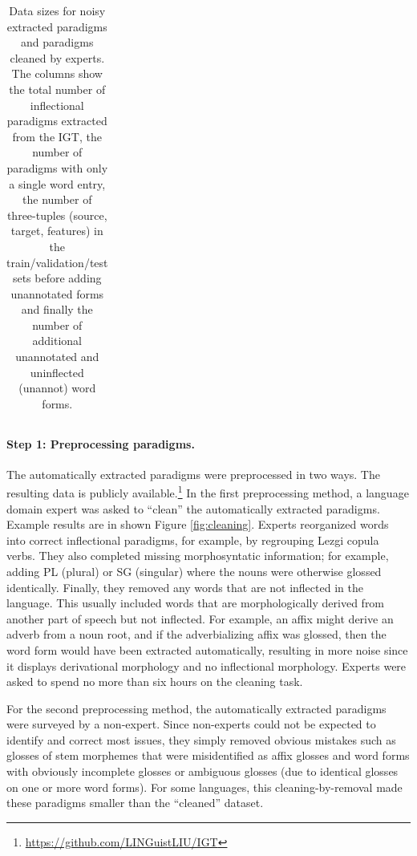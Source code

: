\begin{table}[!tb]
\begin{tabular}{l|ccccccc}
    \end{tabular}
    \caption[IGT2P data]{Data sizes for noisy extracted paradigms and paradigms cleaned by experts. The columns show the total number of inflectional paradigms extracted from the IGT, the number of paradigms with only a single word entry, the number of three-tuples (source, target, features) in the train/validation/test sets before adding unannotated forms and finally the number of additional unannotated and uninflected (unannot) word forms.}
    \label{tab:IGT2Pdata}
\end{table}


\paragraph{Step 1: Preprocessing paradigms.}
The automatically extracted paradigms were preprocessed in two ways. The resulting data is publicly available.\footnote{\url{https://github.com/LINGuistLIU/IGT}}
In the first preprocessing method, a language domain expert was asked to ``clean'' the automatically extracted paradigms. Example results are in shown Figure \ref{fig:cleaning}. Experts reorganized words into correct inflectional paradigms, for example, by regrouping Lezgi copula verbs. They also completed missing morphosyntatic information; for example, adding PL (plural) or SG (singular) where the nouns were otherwise glossed identically. Finally, they removed any words that are not inflected in the language. This usually included words that are morphologically derived from another part of speech but not inflected. For example, an affix might derive an adverb from a noun root, and if the adverbializing affix was glossed, then the word form would have been extracted automatically, resulting in more noise since it displays derivational morphology and no inflectional morphology. Experts were asked to spend no more than six hours on the cleaning task. 

For the second preprocessing method, the automatically extracted paradigms were surveyed by a non-expert. Since non-experts could not be expected to identify and correct most issues, they simply removed obvious mistakes such as glosses of stem morphemes that were misidentified as affix glosses and word forms with obviously incomplete glosses or ambiguous glosses (due to identical glosses on one or more word forms). For some languages, this cleaning-by-removal made these paradigms smaller than the ``cleaned'' dataset.

